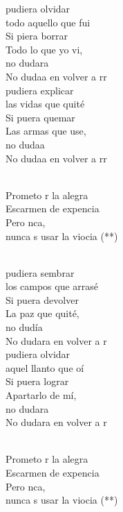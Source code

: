 \documentclass[12pt]{article}
\begin{document}
\begin{multicols*}{2}
\begin{cancion}%
	pudiera olvidar \\
todo aquello que fui\\
	Si piera borrar\\
Todo lo que yo vi, \\
	no dudara\\
	No dudaa en volver a rr \\
	pudiera explicar\\
las vidas que quité\\
	Si puera quemar\\
Las armas que use, \\
	no dudaa \\
	No dudaa en volver a rr \\\jump\\
	\begin{chorus}%
	Prometo r la alegra\\
	Escarmen de  expencia\\
	Pero nca,\\
	nunca s usar la viocia (**) \\
	\end{chorus}%
	\jump\\
	pudiera sembrar \\
los campos que arrasé\\
	Si puera devolver\\
La paz que quité, \\
	no dudía\\
	No dudara en volver a r \\
	pudiera olvidar \\
aquel llanto que oí\\
	Si puera lograr\\
Apartarlo de mí, \\
	no dudara\\
	No dudara en volver a r \\\jump\\
	\begin{chorus}%
	Prometo r la alegra\\
	Escarmen de  expencia\\
	Pero nca,\\
	nunca s usar la viocia (**) \\
	\end{chorus}%
	\jump\\
\end{cancion}%


\end{multicols*}
\end{document}
